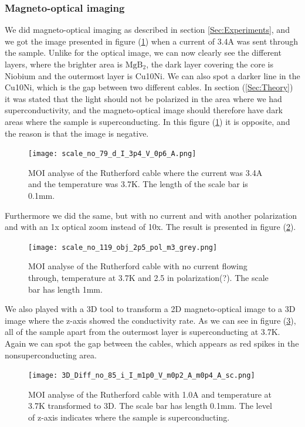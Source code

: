 \documentclass{comjnl}
\newcommand*\chem[1]{\ensuremath{\mathrm{#1}}}
\begin{document}
\subsubsection{Magneto-optical imaging}
We did magneto-optical imaging as described in section \ref{Sec:Experiments}, and we got the image presented in figure (\ref{fig:moi2d1}) when a current of 3.4A was sent through the sample. Unlike for the optical image, we can now clearly see the different layers, where the brighter area is \chem{MgB_2}, the dark layer covering the core is Niobium and the outermost layer is Cu10Ni. We can also spot a darker line in the Cu10Ni, which is the gap between two different cables. In section (\ref{Sec:Theory}) it was stated that the light should not be polarized in the area where we had superconductivity, and the magneto-optical image should therefore have dark areas where the sample is superconducting. In this figure (\ref{fig:moi2d1}) it is opposite, and the reason is that the image is negative. 
\begin{figure}[h]
\centering
\texttt{[image: scale\_no\_79\_d\_I\_3p4\_V\_0p6\_A.png]}
\caption{MOI analyse of the Rutherford cable where the current was 3.4A and the temperature was 3.7K. The length of the scale bar is 0.1mm. \label{fig:moi2d1}}
\end{figure}

Furthermore we did the same, but with no current and with another polarization and with an 1x optical zoom instead of 10x. The result is presented in figure (\ref{fig:moi2d2}). 
\begin{figure}[h]
\centering
\texttt{[image: scale\_no\_119\_obj\_2p5\_pol\_m3\_grey.png]}
\caption{MOI analyse of the Rutherford cable with no current flowing through, temperature at 3.7K and 2.5 in polarization(?). The scale bar has length 1mm. \label{fig:moi2d2}}
\end{figure}

We also played with a 3D tool to transform a 2D magneto-optical image to a 3D image where the z-axis showed the conductivity rate. As we can see in figure (\ref{fig:moi3d}), all of the sample apart from the outermost layer is superconducting at 3.7K. Again we can spot the gap between the cables, which appears as red spikes in the nonsuperconducting area. 
\begin{figure}[h]
\centering
\texttt{[image: 3D\_Diff\_no\_85\_i\_I\_m1p0\_V\_m0p2\_A\_m0p4\_A\_sc.png]}
\caption{MOI analyse of the Rutherford cable with 1.0A and temperature at 3.7K transformed to 3D. The scale bar has length 0.1mm. The level of z-axis indicates where the sample is superconducting.\label{fig:moi3d}}
\end{figure}
\end{document}
